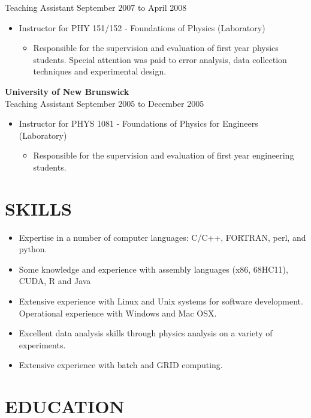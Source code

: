 \documentclass[margin]{res}
\begin{document}
\begin{resume}
\begin{itemize}
\begin{itemize}
  \end{itemize}
\end{itemize}

Teaching Assistant \hfill September 2007 to April 2008 
\begin{itemize}
\item Instructor for PHY 151/152 - Foundations of Physics  (Laboratory)
  \begin{itemize}
    \item Responsible for the supervision and evaluation of first year physics students.  Special attention was paid to error analysis, data collection techniques and experimental design.
  \end{itemize}
\end{itemize}


{\bf University of New Brunswick} \\
Teaching Assistant \hfill September 2005 to December 2005 
\begin{itemize}
\item Instructor for PHYS 1081 - Foundations of Physics for Engineers (Laboratory)
  \begin{itemize}
    \item Responsible for the supervision and evaluation of first year engineering students.
  \end{itemize}
\end{itemize}


\section{SKILLS}

\begin{itemize}
  \item Expertise in a number of computer languages: C/C++, FORTRAN, perl, and python.
  \item Some knowledge and experience with assembly languages (x86, 68HC11), CUDA, R and Java
  \item Extensive experience with Linux and Unix systems for software development. Operational experience with Windows and Mac OSX.
  \item Excellent data analysis skills through physics analysis on a variety of experiments. 
  \item Extensive experience with batch and GRID computing.
\end{itemize}

\section{EDUCATION}


\end{resume}
\end{document}
